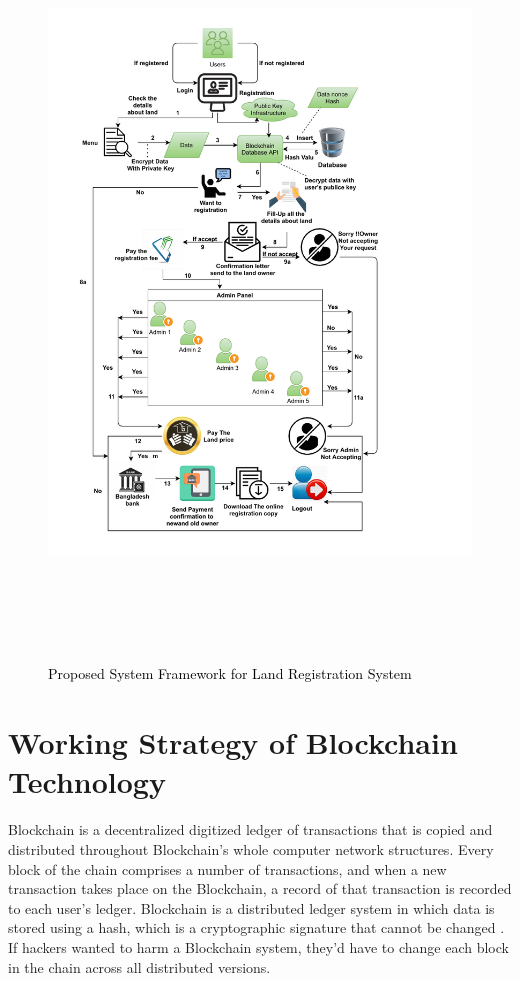 \documentclass[12pt]{ucthesis}
\begin{document}
\vspace{-2mm}
 \begin{figure}[!t]
 \centering
\includegraphics[width=18cm, height=20cm]{./img/fig03380.pdf}
\caption{\textcolor{black}{Proposed System Framework for Land Registration System}} \label{fig3}
\end{figure}
\vspace{2mm}
    
	 
\section{Working Strategy of Blockchain Technology}
    Blockchain is a decentralized digitized ledger of transactions that is copied and distributed throughout Blockchain's whole computer network structures\cite{refAHW,biswas2021landchain,mukherjee2020hyper,al2021towards,9642537,biswas2022drlas,mist2021,rabbi2021bls,sticounterfeit2021,ahmed2021dbst,biswas2021biot,ahamed2021bps}. Every block of the chain comprises a number of transactions, and when a new transaction takes place on the Blockchain, a record of that transaction is recorded to each user's ledger\cite{rf7}. Blockchain is a distributed ledger system in which data is stored using a hash, which is a cryptographic signature that cannot be changed \cite{rf17}. If hackers wanted to harm a Blockchain system, they'd have to change each block in the chain across all distributed versions.
\end{document}
